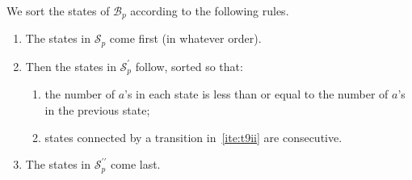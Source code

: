 \documentclass[11pt]{article}
\theoremstyle{remark}\newtheorem{remark}[theorem]{Remark}
\begin{document}
\noindent
We sort the states of $\mathcal{B}_p$ according to the following rules.
\vspace{0.5em}
\begin{enumerate}[label={\footnotesize(o\arabic*)},labelindent=1em,itemsep=0.5em,topsep=0.5em]
	\setlength\itemsep{0.5em}
	
	\item\label{ite:ord1} The states in $\mathcal{S}_p$ come first (in whatever order).
	
	\item\label{ite:ord2} Then the states in $\mathcal{S}_p^\prime$ follow, sorted so that:
	\vspace{0.5em}
	\begin{enumerate}[label={\footnotesize(o2\roman*)},labelindent=1em,itemsep=0.5em,topsep=0.5em]
		\setlength\itemsep{0.5em}
		
		\item the number of $a$'s in each state is less than or equal to the number of $a$'s in the previous state;
		
		\item states connected by a transition in~\ref{ite:t9ii} are consecutive.
	\end{enumerate}
	
	\item\label{ite:ord3} The states in $\mathcal{S}_p^{\prime\prime}$ come last.
\end{enumerate}
\end{document}
